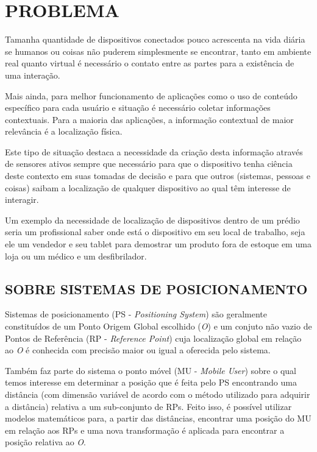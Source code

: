 \chapter{PROBLEMA}
\label{chap:PROBLEMA}

Tamanha quantidade de dispositivos conectados pouco acrescenta na vida diária se
humanos ou coisas não puderem simplesmente se encontrar, tanto em ambiente real
quanto virtual é necessário o contato entre as partes para a existência de uma
interação.

Mais ainda, para melhor funcionamento de aplicações como o uso de conteúdo
específico para cada usuário e situação é necessário coletar informações
contextuais. Para a maioria das aplicações, a informação contextual de maior
relevância é a localização física.

Este tipo de situação destaca a necessidade da criação desta informação através
de sensores ativos sempre que necessário para que o dispositivo tenha ciência
deste contexto em suas tomadas de decisão e para que outros (sistemas, pessoas e
coisas) saibam a localização de qualquer dispositivo ao qual têm interesse de
interagir.

Um exemplo da necessidade de localização de dispositivos dentro de um prédio
seria um profissional saber onde está o dispositivo em seu local de trabalho,
seja ele um vendedor e seu tablet para demostrar um produto fora de estoque em
uma loja ou um médico e um desfibrilador.

\section{SOBRE SISTEMAS DE POSICIONAMENTO}
\label{sec:SOBRE SISTEMAS DE POSICIONAMENTO}

Sistemas de posicionamento (PS - \textit{Positioning System}) são geralmente
constituídos de um Ponto Origem Global escolhido (\textit{O}) e um conjuto não
vazio de Pontos de Referência (RP - \textit{Reference Point}) cuja localização
global em relação ao \textit{O} é conhecida com precisão maior ou igual a
oferecida pelo sistema.

Também faz parte do sistema o ponto móvel (MU - \textit{Mobile User}) sobre o
qual temos interesse em determinar a posição que é feita pelo PS encontrando uma
distância (com dimensão variável de acordo com o método utilizado para adquirir
a distância) relativa a um sub-conjunto de RPs. Feito isso, é possível utilizar
modelos matemáticos para, a partir das distâncias, encontrar uma posição do MU
em relação aos RPs e uma nova transformação é aplicada para encontrar a posição
relativa ao \textit{O}.

